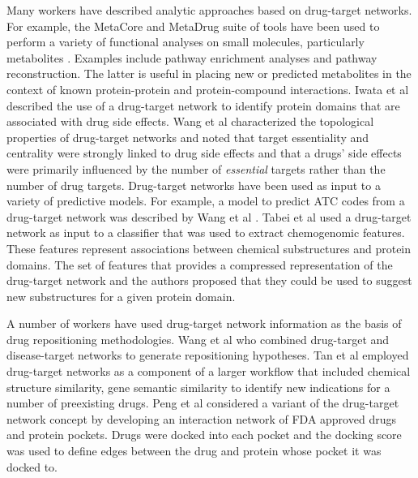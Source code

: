 \documentclass[]{book}
\begin{document}
Many workers have described analytic approaches based on drug-target
networks. For example, the MetaCore and MetaDrug suite of tools have
been used to perform a variety of functional analyses on small
molecules, particularly metabolites \cite{Brennan:2009kx}.  Examples
include pathway enrichment analyses and pathway reconstruction. The
latter is useful in placing new or predicted metabolites in the
context of known protein-protein and protein-compound
interactions. Iwata et al \cite{Iwata:2013lk} described the use of a
drug-target network to identify protein domains that are associated
with drug side effects. Wang et al \cite{Wang:2013gn} characterized
the topological properties of drug-target networks and noted that
target essentiality and centrality were strongly linked to drug side
effects and that a drugs' side effects were primarily influenced by
the number of \emph{essential} targets rather than the number of drug
targets. Drug-target networks have been used as input to a variety of
predictive models. For example, a model to predict ATC codes from a
drug-target network was described by Wang et al
\cite{Wang:2013ye}. Tabei et al \cite{Tabei:2012tn} used a drug-target
network as input to a classifier that was used to extract chemogenomic
features. These features represent associations between chemical
substructures and protein domains. The set of features that provides a
compressed representation of the drug-target network and the authors
proposed that they could be used to suggest new substructures for a
given protein domain. 

A number of workers have used drug-target network information as the
basis of drug repositioning methodologies. Wang et al
\cite{Wang:2014lp} who combined drug-target and disease-target
networks to generate repositioning hypotheses. Tan et al
\cite{Tan:2014qb} employed drug-target networks as a component of a
larger workflow that included chemical structure similarity, gene
semantic similarity to identify new indications for a number of
preexisting drugs.  Peng et al \cite{Peng:2014vy} considered a variant
of the drug-target network concept by developing an interaction
network of FDA approved drugs and protein pockets. Drugs were docked
into each pocket and the docking score was used to define edges
between the drug and protein whose pocket it was docked to.
\end{document}
